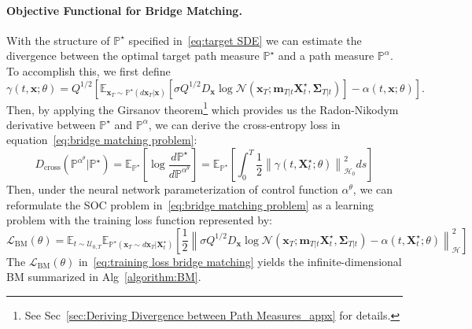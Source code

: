 \documentclass[nohyperref]{article}
\theoremstyle{plain}
\theoremstyle{remark}
\newcommand{\mc}{\mathcal}
\newcommand{\mb}{\mathbf}
\newcommand{\norm}[1]{\left\lVert#1\right\rVert}
\begin{document}
\paragraph{Objective Functional for Bridge Matching.}
With the structure of $\mathbb{P}^{\star}$ specified in~\eqref{eq:target SDE} we can estimate the divergence between the optimal target path measure $\mathbb{P}^{\star}$ and a path measure $\mathbb{P}^{\alpha}$.
To accomplish this, we first define
\begin{equation}\label{eq:cross entropy gamma}
    \gamma(t, \mb{x}; \theta) = Q^{1/2} \left[ \mathbb{E}_{\mb{x}_T \sim \mathbb{P}^{\star}(d\mb{x}_T|\mb{x})}\left[ \sigma Q^{1/2} D_{\mb{x}} \log \mc{N}(\mb{x}_T; \mb{m}_{T|t} \mb{X}^{\star}_t, \mb{\Sigma}_{T|t}) \right] - \alpha(t, \mb{x}; \theta)\right].
\end{equation}
Then, by applying the Girsanov theorem\footnote{See Sec~\ref{sec:Deriving Divergence between Path Measures_appx} for details.} which provides us the Radon-Nikodym derivative between $\mathbb {P}^{\star}$ and $\mathbb{P}^{\alpha}$, we can derive the cross-entropy loss in equation~\eqref{eq:bridge matching problem}:
\begin{equation}\label{eq:cross entropy loss}
    D_{\text{cross}}(\mathbb{P}^{\alpha^{\theta}}|\mathbb{P}^{\star}) = \mathbb{E}_{\mathbb{P}^{\star}}\left[ \log \frac{d\mathbb{P}^{\star}}{d\mathbb{P}^{\alpha^{\theta}}}\right] = \mathbb{E}_{\mathbb{P}^{\star}}\left[ \int_0^T \frac{1}{2}\norm{\gamma(t, \mb{X}^{\star}_t ; \theta)}^2_{\mc{H}_0} ds \right]
\end{equation}
Then, under the neural network parameterization of control function $\alpha^{\theta}$, we can reformulate the SOC problem in~\eqref{eq:bridge matching problem} as a learning problem with the training loss function represented by:
\begin{equation}\label{eq:training loss bridge matching}
    \mc{L}_{\text{BM}}(\theta) = \mathbb{E}_{t \sim \mc{U}_{0, T}} \mathbb{E}_{\mathbb{P}^{\star}(\mb{x}_T \sim d\mb{x}_T|\mb{X}^{\star}_t)}\left[ \frac{1}{2}\norm{\sigma Q^{1/2} D_{\mb{x}} \log \mc{N}(\mb{x}_T; \mb{m}_{T|t} \mb{X}^{\star}_t, \mb{\Sigma}_{T|t}) - \alpha(t, \mb{X}^{\star}_t; \theta)}^2_{\mc{H}}\right]
\end{equation}
The $\mc{L}_{\text{BM}}(\theta)$ in~\eqref{eq:training loss bridge matching} yields the infinite-dimensional BM summarized in Alg~\ref{algorithm:BM}.
\end{document}
